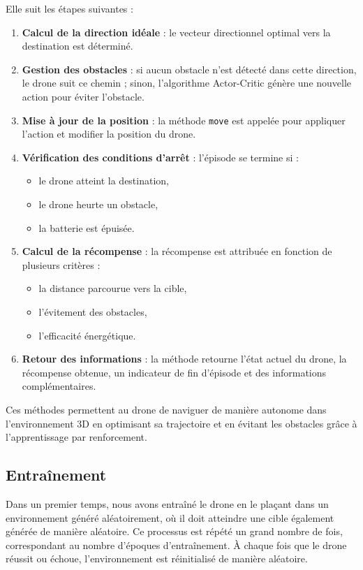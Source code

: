 \documentclass[a4paper, 12pt]{article}
\begin{document}
Elle suit les étapes suivantes :
\begin{enumerate}
    \item \textbf{Calcul de la direction idéale} : le vecteur directionnel optimal vers la destination est déterminé.
    \item \textbf{Gestion des obstacles} : si aucun obstacle n’est détecté dans cette direction, le drone suit ce chemin ; sinon, l’algorithme Actor-Critic génère une nouvelle action pour éviter l’obstacle.
    \item \textbf{Mise à jour de la position} : la méthode \texttt{move} est appelée pour appliquer l’action et modifier la position du drone.
    \item \textbf{Vérification des conditions d’arrêt} : l’épisode se termine si :
    \begin{itemize}
        \item le drone atteint la destination,
        \item le drone heurte un obstacle,
        \item la batterie est épuisée.
    \end{itemize}
    \item \textbf{Calcul de la récompense} : la récompense est attribuée en fonction de plusieurs critères :
    \begin{itemize}
        \item la distance parcourue vers la cible,
        \item l’évitement des obstacles,
        \item l’efficacité énergétique.
    \end{itemize}
    \item \textbf{Retour des informations} : la méthode retourne l’état actuel du drone, la récompense obtenue, un indicateur de fin d’épisode et des informations complémentaires.
\end{enumerate}

Ces méthodes permettent au drone de naviguer de manière autonome dans l’environnement 3D en optimisant sa trajectoire et en évitant les obstacles grâce à l’apprentissage par renforcement.

\subsection{Entraînement}
Dans un premier temps, nous avons entraîné le drone en le plaçant dans un environnement généré aléatoirement, où il doit atteindre une cible également générée de manière aléatoire. Ce processus est répété un grand nombre de fois, correspondant au nombre d'époques d'entraînement. À chaque fois que le drone réussit ou échoue, l'environnement est réinitialisé de manière aléatoire.
\end{document}
